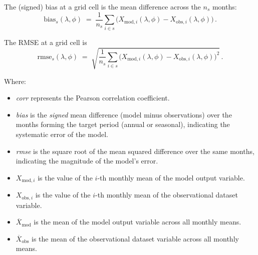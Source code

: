 \documentclass[pdflatex,sn-chicago]{sn-jnl}%
\theoremstyle{thmstyleone}%
\theoremstyle{thmstyletwo}%
\theoremstyle{thmstylethree}%
\begin{document}
The (signed) bias at a grid cell is the mean difference across the \(n_s\) months:
\begin{equation}
\label{eq:bias}
\text{bias}_s(\lambda,\phi) \;=\; \frac{1}{n_s} \sum_{i\in s} \bigl( X_{\text{mod},i}(\lambda,\phi) - X_{\text{obs},i}(\lambda,\phi) \bigr) \, .
\end{equation}

The RMSE at a grid cell is
\begin{equation}
\label{eq:rmse}
\text{rmse}_s(\lambda,\phi) \;=\; \sqrt{ \frac{1}{n_s} \sum_{i\in s} \bigl( X_{\text{mod},i}(\lambda,\phi) - X_{\text{obs},i}(\lambda,\phi) \bigr)^2 } \, .
\end{equation}


Where:
\begin{itemize}
    \item \textit{corr} represents the Pearson correlation coefficient.
    \item \textit{bias} is the \emph{signed} mean difference (model minus observations) over the months forming the target period (annual or seasonal), indicating the systematic error of the model.
    \item \textit{rmse} is the square root of the mean squared difference over the same months, indicating the magnitude of the model's error.
    \item $X_{\text{mod},i}$ is the value of the $i$-th monthly mean of the model output variable.
    \item $X_{\text{obs},i}$ is the value of the $i$-th monthly mean of the observational dataset variable.
    \item $\overline{X}_{\text{mod}}$ is the mean of the model output variable across all monthly means.
    \item $\overline{X}_{\text{obs}}$ is the mean of the observational dataset variable across all monthly means.
\end{itemize}
\vspace{1em}
\end{document}
